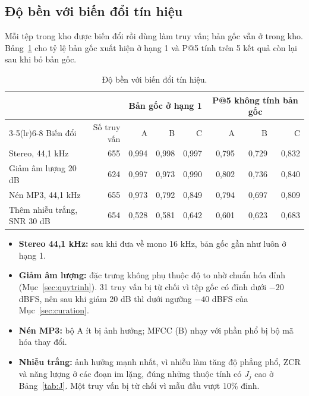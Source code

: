 \documentclass[11pt,a4paper]{article}
\begin{document}
\subsection{Độ bền với biến đổi tín hiệu}\label{sec:doben}
Mỗi tệp trong kho được biến đổi rồi dùng làm truy vấn; bản gốc vẫn ở trong kho. Bảng~\ref{tab:doben} cho tỷ lệ bản gốc xuất hiện ở hạng 1 và P@5 tính trên 5 kết quả còn lại sau khi bỏ bản gốc.
\begin{table}[htbp]
\centering\small
\caption{Độ bền với biến đổi tín hiệu.}\label{tab:doben}
\begin{tabular}{lrrrrrrr}
\toprule
& & \multicolumn{3}{c}{Bản gốc ở hạng 1} & \multicolumn{3}{c}{P@5 không tính bản gốc}\\
\cmidrule(lr){3-5}\cmidrule(lr){6-8}
Biến đổi & Số truy vấn & A & B & C & A & B & C\\\midrule
Stereo, 44,1 kHz & 655 & 0,994 & 0,998 & 0,997 & 0,795 & 0,729 & 0,832\\
Giảm âm lượng 20 dB & 624 & 0,997 & 0,973 & 0,990 & 0,802 & 0,736 & 0,840\\
Nén MP3, 44,1 kHz & 655 & 0,973 & 0,792 & 0,849 & 0,794 & 0,697 & 0,809\\
Thêm nhiễu trắng, SNR 30 dB & 654 & 0,528 & 0,581 & 0,642 & 0,601 & 0,623 & 0,683\\\bottomrule
\end{tabular}
\end{table}
\begin{itemize}
\item \textbf{Stereo 44,1 kHz:} sau khi đưa về mono 16 kHz, bản gốc gần như luôn ở hạng 1.
\item \textbf{Giảm âm lượng:} đặc trưng không phụ thuộc độ to nhờ chuẩn hóa đỉnh (Mục~\ref{sec:quytrinh}). 31 truy vấn bị từ chối vì tệp gốc có đỉnh dưới $-20$ dBFS, nên sau khi giảm 20 dB thì dưới ngưỡng $-40$ dBFS của Mục~\ref{sec:curation}.
\item \textbf{Nén MP3:} bộ A ít bị ảnh hưởng; MFCC (B) nhạy với phần phổ bị bộ mã hóa thay đổi.
\item \textbf{Nhiễu trắng:} ảnh hưởng mạnh nhất, vì nhiễu làm tăng độ phẳng phổ, ZCR và năng lượng ở các đoạn im lặng, đúng những thuộc tính có $J_j$ cao ở Bảng~\ref{tab:J}. Một truy vấn bị từ chối vì mẫu đầu vượt 10\% đỉnh.
\end{itemize}
\end{document}
